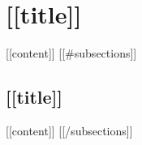 \section{[[title]]}
[[content]]
[[#subsections]]
\subsection{[[title]]}
[[content]]
[[/subsections]]
